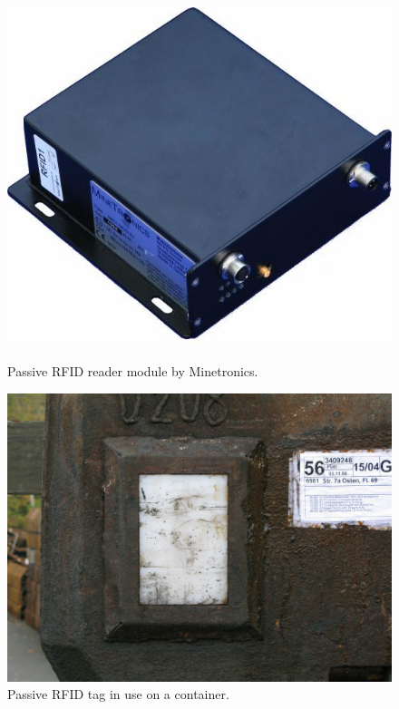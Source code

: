 \documentclass[../main.tex]{subfiles}
\begin{document}
\begin{figure}[!htbp]
\begin{minipage}{0.49\linewidth}
\includegraphics[width=\textwidth, trim={0 0 0 0},clip]{pictures/passive_rfid_reader_module.png}
\caption{Passive RFID reader module by Minetronics\cite{Thesis_CM}.}
\label{fig:passive_rfid_reader_module}
\end{minipage}\hfill%
\begin{minipage}{0.49\linewidth}
\includegraphics[width=\textwidth, trim={0 0 9cm 0},clip]{pictures/passive_rfid_tag_module.png}
\caption{Passive RFID tag in use on a container\cite{Thesis_CM}.}
\label{fig:passive_rfid_tag_module}
\end{minipage}
\end{figure}
\end{document}

